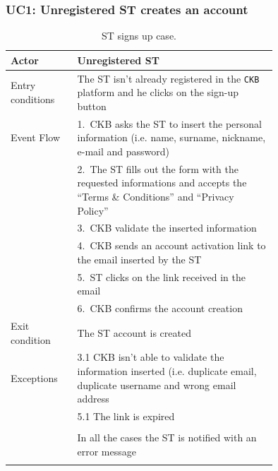\subsubsection*{UC1: Unregistered ST creates an account}
\begin{center}
  \begin{longtable}{l|p{0.75\linewidth}}
    \hline
    Actor & Unregistered ST \\
    \hline
    Entry conditions & The ST isn’t already registered in the \verb|CKB| platform and he clicks on the sign-up button \\
    \hline
    Event Flow & 1.\ CKB asks the ST to insert the personal information (i.e. name, surname, nickname, e-mail and password) \\
    & 2.\ The ST fills out the form with the requested informations and accepts the “Terms \& Conditions” and “Privacy Policy” \\
    & 3.\ CKB validate the inserted information \\
    & 4.\ CKB sends an account activation link to the email inserted by the ST \\
    & 5.\ ST clicks on the link received in the email \\
    & 6.\ CKB confirms the account creation  \\
    \hline
    Exit condition & The ST account is created \\
    \hline
    Exceptions & 3.1 CKB isn’t able to validate the information inserted (i.e. duplicate email, duplicate username and wrong email address \\
    & 5.1 The link is expired \\ \\
    & In all the cases the ST is notified with an error message\\
    \hline
    \caption{ST signs up case.}
    \label{tab: ST_signs_up}
  \end{longtable}


\end{center}
